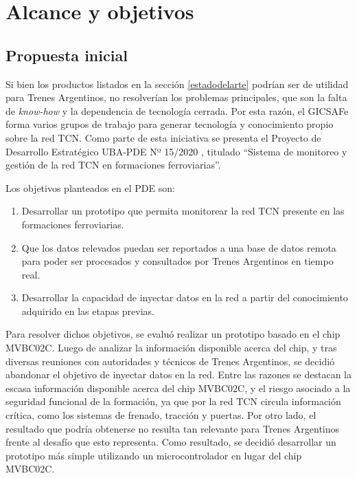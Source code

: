 \pagebreak

\section{Alcance y objetivos}
\subsection{Propuesta inicial}
\label{sec:propuesta}

Si bien los productos listados en la sección \ref{estadodelarte} podrían ser de utilidad para Trenes Argentinos, no resolverían los problemas principales, que son la falta de \emph{know-how} y la dependencia de tecnología cerrada. Por esta razón, el GICSAFe forma varios grupos de trabajo para generar tecnología y conocimiento propio sobre la red TCN. Como parte de esta iniciativa se presenta el Proyecto de Desarrollo Estratégico UBA-PDE Nº 15/2020 \cite{pde2020}, titulado ``Sistema de monitoreo y gestión de la red TCN en formaciones ferroviarias''.

Los objetivos planteados en el PDE son:

\begin{enumerate}
\item Desarrollar un prototipo que permita monitorear la red TCN presente en las formaciones ferroviarias.
\item Que los datos relevados puedan ser reportados a una base de datos remota para poder ser procesados y consultados por Trenes Argentinos en tiempo real.
\item Desarrollar la capacidad de inyectar datos en la red a partir del conocimiento adquirido en las etapas previas.
\end{enumerate}

Para resolver dichos objetivos, se evaluó realizar un prototipo basado en el chip MVBC02C.
Luego de analizar la información disponible acerca del chip, y tras diversas reuniones con autoridades y técnicos de Trenes Argentinos, se decidió abandonar el objetivo de inyectar datos en la red.
Entre las razones se destacan la escasa información disponible acerca del chip MVBC02C, y el riesgo asociado a la seguridad funcional de la formación, ya que por la red TCN circula información crítica, como los sistemas de frenado, tracción y puertas.
Por otro lado, el resultado que podría obtenerse no resulta tan relevante para Trenes Argentinos frente al desafío que esto representa.
Como resultado, se decidió desarrollar un prototipo más simple utilizando un microcontrolador en lugar del chip MVBC02C.

